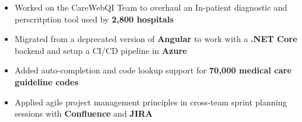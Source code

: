 \begin{itemize}
    \item Worked on the CareWebQI Team to overhaul an In-patient diagnostic and perscritption tool used by \textbf{2,800 hospitals}
    \item Migrated from a deprecated version of \textbf{Angular} to work with a \textbf{.NET Core} backend and setup a CI/CD pipeline in \textbf{Azure}
    \item Added auto-completion and code lookup support for \textbf{70,000 medical care guideline codes}
    \item Applied agile project management principles in cross-team sprint planning sessions with \textbf{Confluence} and \textbf{JIRA}
\end{itemize}
